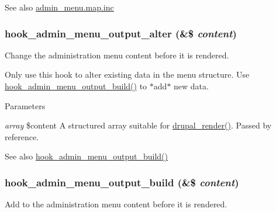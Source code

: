 \begin{DoxySeeAlso}{See also}
\hyperlink{admin__menu_8map_8inc}{admin\_\-menu.map.inc} 
\end{DoxySeeAlso}
\hypertarget{admin__menu_8api_8php_a7502be228e9b3e1a04cbc17fa0e42b25}{
\subsubsection[{hook\_\-admin\_\-menu\_\-output\_\-alter}]{\setlength{\rightskip}{0pt plus 5cm}hook\_\-admin\_\-menu\_\-output\_\-alter (\&\$ {\em content})}}
\label{admin__menu_8api_8php_a7502be228e9b3e1a04cbc17fa0e42b25}
Change the administration menu content before it is rendered.

Only use this hook to alter existing data in the menu structure. Use \hyperlink{admin__menu_8api_8php_a12517a63549c0d184148d7b5ed9907f4}{hook\_\-admin\_\-menu\_\-output\_\-build()} to $\ast$add$\ast$ new data.


\begin{DoxyParams}{Parameters}
\item[{\em array}]\$content A structured array suitable for \hyperlink{common_8inc_a05798b44e8d6c496d4bee5cc32fa7851}{drupal\_\-render()}. Passed by reference.\end{DoxyParams}
\begin{DoxySeeAlso}{See also}
\hyperlink{admin__menu_8api_8php_a12517a63549c0d184148d7b5ed9907f4}{hook\_\-admin\_\-menu\_\-output\_\-build()} 
\end{DoxySeeAlso}
\hypertarget{admin__menu_8api_8php_a12517a63549c0d184148d7b5ed9907f4}{
\subsubsection[{hook\_\-admin\_\-menu\_\-output\_\-build}]{\setlength{\rightskip}{0pt plus 5cm}hook\_\-admin\_\-menu\_\-output\_\-build (\&\$ {\em content})}}
\label{admin__menu_8api_8php_a12517a63549c0d184148d7b5ed9907f4}
Add to the administration menu content before it is rendered.

